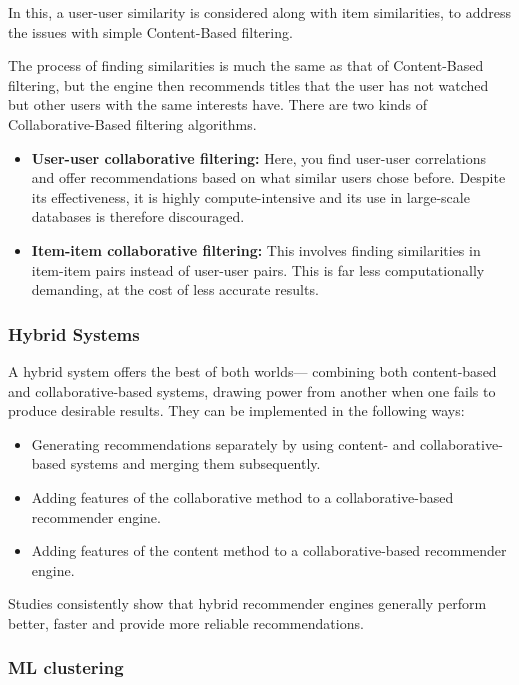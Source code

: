 \documentclass{article}
\begin{document}
In this, a user-user similarity is considered along with item similarities, to address the issues with simple Content-Based filtering.

\medskip

\noindent The process of finding similarities is much the same as that of Content-Based filtering, but the engine then recommends titles that the user has not watched but other users with the same interests have. There are two kinds of Collaborative-Based filtering algorithms.

\begin{itemize}
    \item{\textbf{User-user collaborative filtering:} Here, you find user-user correlations and offer recommendations based on what similar users chose before. Despite its effectiveness, it is highly compute-intensive and its use in large-scale databases is therefore discouraged.}
    \item{\textbf{Item-item collaborative filtering:} This involves finding similarities in item-item pairs instead of user-user pairs. This is far less computationally demanding, at the cost of less accurate results.}
\end{itemize}

\subsubsection{Hybrid Systems}

A hybrid system offers the best of both worlds— combining both content-based and collaborative-based systems, drawing power from another when one fails to produce desirable results. They can be implemented in the following ways:

\begin{itemize}
    \item{Generating recommendations separately by using content- and collaborative-based systems and merging them subsequently.}
    \item{Adding features of the collaborative method to a collaborative-based recommender engine.}
    \item{Adding features of the content method to a collaborative-based recommender engine.}
\end{itemize}

\noindent Studies consistently show that hybrid recommender engines generally perform better, faster and provide more reliable recommendations.

\subsubsection{ML clustering}
\end{document}
